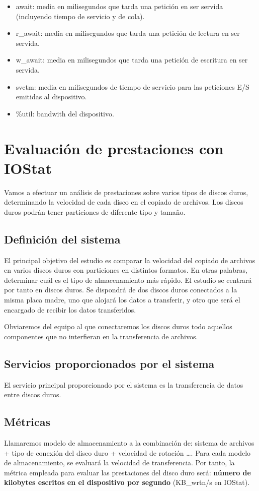 \documentclass[a4paper,10pt]{article}
\renewcommand{\texttt}[2][black!60]{\textcolor{#1}{\ttfamily #2}}
\begin{document}
\begin{itemize}
 \item{\texttt{await}}: media en milisegundos que tarda una petición en ser servida (incluyendo tiempo de servicio y de cola).
 \item{\texttt{r\_await}}: media en milisegundos que tarda una petición de lectura en ser servida.
 \item{\texttt{w\_await}}: media en milisegundos que tarda una petición de escritura en ser servida.
 \item{\texttt{svctm}}: media en milisegundos de tiempo de servicio para las peticiones E/S emitidas al dispositivo.
 \item{\texttt{\%util}}: bandwith del dispositivo.
\end{itemize}

\section{Evaluación de prestaciones con IOStat}
Vamos a efectuar un análisis de prestaciones sobre varios tipos de discos duros, determinando la velocidad de cada 
disco en el copiado de archivos. Los discos duros podrán tener particiones de diferente tipo y tamaño.

\subsection{Definición del sistema}
El principal objetivo del estudio es comparar la velocidad del copiado de archivos en varios discos duros con particiones
en distintos formatos. En otras palabras, determinar cuál es el tipo de almacenamiento más rápido. El estudio se centrará
por tanto en discos duros. Se dispondrá de dos discos duros conectados a la misma placa madre, uno que alojará los datos a
transferir, y otro que será el encargado de recibir los datos transferidos.

Obviaremos del equipo al que conectaremos los discos duros todo aquellos componentes que no interfieran en la transferencia 
de archivos.

\subsection{Servicios proporcionados por el sistema}
El servicio principal proporcionado por el sistema es la transferencia de datos entre discos duros.

\subsection{Métricas}
Llamaremos modelo de almacenamiento a la combinación de: sistema de archivos + tipo de conexión del disco duro + velocidad de rotación \ldots.
Para cada modelo de almacenamiento, se evaluará la velocidad de transferencia. Por tanto, la métrica empleada para evaluar las prestaciones 
del disco duro será: \textbf{número de kilobytes escritos en el dispositivo por segundo} (\texttt{KB\_wrtn/s} en IOStat).
 
\end{document}
